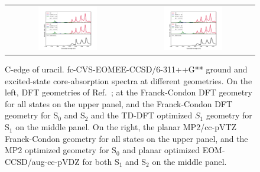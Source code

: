 \documentclass[journal=jctcce,manuscript=article]{achemso}
\begin{document}
\begin{figure}[H]
\caption{C-edge of uracil. fc-CVS-EOMEE-CCSD/6-311++G** ground and excited-state core-absorption spectra at different geometries. On the left, DFT geometries of Ref.~; at the Franck-Condon DFT geometry for all states on the upper panel, and the Franck-Condon DFT geometry for S$_0$ and S$_2$ and the TD-DFT  optimized $S_1$ geometry for S$_1$ on the middle panel. On the right, the planar MP2/cc-pVTZ Franck-Condon geometry for all states on the upper panel, and the MP2 optimized geometry for S$_0$ and planar optimized EOM-CCSD/aug-cc-pVDZ for both S$_1$ and S$_2$ on the middle panel.
\label{fgr:uracil:trnexafs_uracil_c}}
\begin{tabular}{cc}
\includegraphics[width=0.5\textwidth]{Spectra/DFT_Uracil_Sn_C_zoom.pdf} 
&
\includegraphics[width=0.5\textwidth]{Spectra/MP2_Uracil_Sn_C_zoom.pdf}
\\
\end{tabular}
\end{figure}
\end{document}
